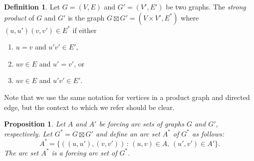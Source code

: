 \documentclass[12pt]{amsart}
\theoremstyle{plain}
\newtheorem{proposition}[theorem]{Proposition}
\theoremstyle{definition}
\newtheorem{definition}{Definition}[section]
\begin{document}
\begin{definition}
Let $G = (V, E)$ and $G' = (V', E')$ be two graphs. 
The {\em strong product} of $G$ and $G'$ is the graph $G\boxtimes G' = (V\times V', E^*)$ where $(u, u')(v, v')\in E^*$ if either
\begin{enumerate}[noitemsep, label=(\alph*)]
    \item $u=v$ and $u'v'\in E'$, 
    \item $uv\in E$ and $u'=v'$, or 
    \item $uv\in E$ and $u'v'\in E'$. 
\end{enumerate}
\end{definition}
Note that we use the same notation for vertices in a product graph and directed edge, but the context to which we refer should be clear. 
\begin{proposition}\label{prop:product}
Let $A$ and $A'$ be forcing arc sets of graphs $G$ and $G'$, respectively. 
Let $G^* = G\boxtimes G'$ and define an arc set $A^*$ of $G^*$ as follows:
$$A^* =\{ ((u,u'),(v,v'))\,:\,(u,v)\in A,\,(u',v')\in A'\}.$$
The arc set $A^*$ is a forcing arc set of $G^*$.
\end{proposition}
\end{document}
